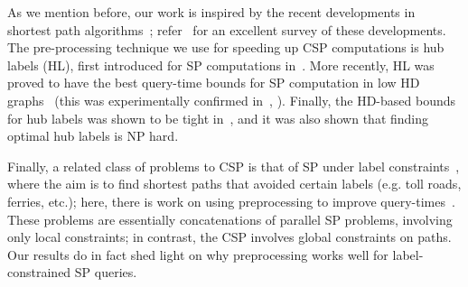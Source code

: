 As we mention before, our work is inspired by the recent developments in shortest path algorithms~\cite{highway2013,hubimplem,highway2010,dimacs09,geisberger_ch_definition,skeleton}; refer~\cite{goldberg_survey} for an excellent survey of these developments. 
The pre-processing technique we use for speeding up CSP computations is hub labels (HL), first introduced for SP computations in~\cite{cohen_definition_hl}. 
More recently, HL was proved to have the best query-time bounds for SP computation in low HD graphs~\cite{highway2013,highway2010} (this was experimentally confirmed in~\cite{hubimplem}, \cite[Figure 7]{goldberg_survey}).  
Finally, the HD-based bounds for hub labels was shown to be tight in~\cite{babenko_hl_complexity,white_complexity_hd}, and it was also shown that finding optimal hub labels is NP hard.

Finally, a related class of problems to CSP is that of SP under label constraints~\cite{language_csp}, where the aim is to find shortest paths that avoided certain labels (e.g. toll roads, ferries, etc.); here, there is work on using preprocessing to improve query-times~\cite{rice_csp}.
These problems are essentially concatenations of parallel SP problems, involving only local constraints; in contrast, the CSP involves global constraints on paths.
Our results do in fact shed light on why preprocessing works well for label-constrained SP queries.